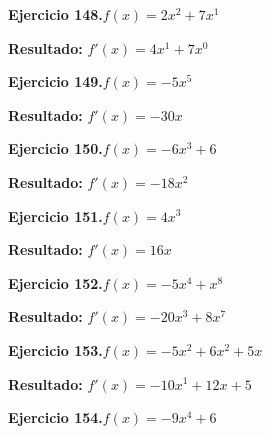 \documentclass[10pt,a4paper]{article}
\begin{document}
\newpage
\begin{ejbox}
\textbf{Ejercicio 148.}\quad $f(x) = 2x^{2} + 7x^{1}$
\end{ejbox}

\begin{solbox}
\textbf{Resultado:} \(\displaystyle f'(x) = 4x^{1} + 7x^{0}\)
\end{solbox}

\begin{ejbox}
\textbf{Ejercicio 149.}\quad $f(x) = -5x^{5}$
\end{ejbox}

\begin{solbox}
\textbf{Resultado:} \(\displaystyle f'(x) = -30x\)
\end{solbox}

\begin{ejbox}
\textbf{Ejercicio 150.}\quad $f(x) = -6x^{3} +6$
\end{ejbox}

\begin{solbox}
\textbf{Resultado:} \(\displaystyle f'(x) = -18x^{2}\)
\end{solbox}

\newpage
\begin{ejbox}
\textbf{Ejercicio 151.}\quad $f(x) = 4x^{3}$
\end{ejbox}

\begin{solbox}
\textbf{Resultado:} \(\displaystyle f'(x) = 16x\)
\end{solbox}

\begin{ejbox}
\textbf{Ejercicio 152.}\quad $f(x) = -5x^{4} + x^{8}$
\end{ejbox}

\begin{solbox}
\textbf{Resultado:} \(\displaystyle f'(x) = -20x^{3} + 8x^{7}\)
\end{solbox}

\begin{ejbox}
\textbf{Ejercicio 153.}\quad $f(x) = -5x^{2} +6x^2 +5x$
\end{ejbox}

\begin{solbox}
\textbf{Resultado:} \(\displaystyle f'(x) = -10x^{1} +12x +5\)
\end{solbox}

\newpage
\begin{ejbox}
\textbf{Ejercicio 154.}\quad $f(x) = -9x^{4} +6$
\end{ejbox}
\end{document}
